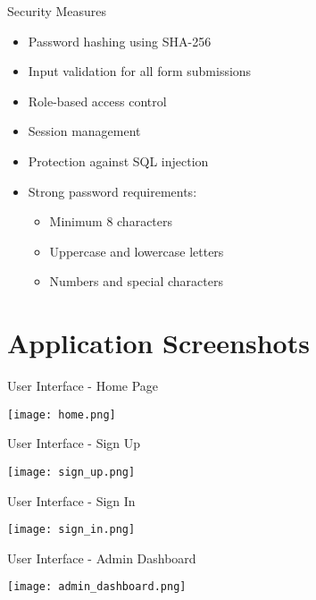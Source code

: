 \documentclass{beamer}
\begin{document}
\begin{frame}{Security Measures}
  \begin{itemize}
    \item Password hashing using SHA-256
    \item Input validation for all form submissions
    \item Role-based access control
    \item Session management
    \item Protection against SQL injection
    \item Strong password requirements:
      \begin{itemize}
        \item Minimum 8 characters
        \item Uppercase and lowercase letters
        \item Numbers and special characters
      \end{itemize}
  \end{itemize}
\end{frame}

\section{Application Screenshots}

\begin{frame}{User Interface - Home Page}
  \begin{center}
    \texttt{[image: home.png]}
  \end{center}
\end{frame}

\begin{frame}{User Interface - Sign Up}
  \begin{center}
    \texttt{[image: sign\_up.png]}
  \end{center}
\end{frame}

\begin{frame}{User Interface - Sign In}
  \begin{center}
    \texttt{[image: sign\_in.png]}
  \end{center}
\end{frame}

\begin{frame}{User Interface - Admin Dashboard}
  \begin{center}
    \texttt{[image: admin\_dashboard.png]}
  \end{center}
\end{frame}
\end{document}
